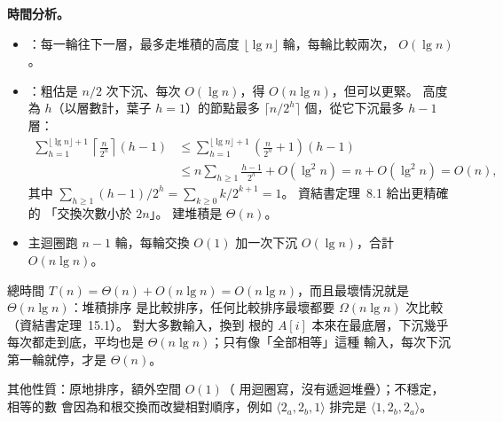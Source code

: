\begin{pastsoln}
\textbf{時間分析。}
\begin{itemize}
\item {}：每一輪往下一層，最多走堆積的高度 $\lfloor \lg n \rfloor$ 輪，每輪比較兩次，
$O(\lg n)$。
\item {}：粗估是 $n/2$ 次下沉、每次 $O(\lg n)$，得 $O(n \lg n)$，但可以更緊。
高度為 $h$（以層數計，葉子 $h = 1$）的節點最多 $\lceil n / 2^h \rceil$ 個，從它下沉最多 $h - 1$ 層：
\begin{align*}
\sum_{h=1}^{\lfloor \lg n \rfloor + 1} \left\lceil \frac{n}{2^h} \right\rceil (h - 1)
&\le \sum_{h=1}^{\lfloor \lg n \rfloor + 1} \left(\frac{n}{2^h} + 1\right)(h - 1) \\
&\le n \sum_{h \ge 1} \frac{h - 1}{2^h} + O(\lg^2 n)
= n + O(\lg^2 n) = O(n),
\end{align*}
其中 $\sum_{h \ge 1} (h-1)/2^h = \sum_{k \ge 0} k / 2^{k+1} = 1$。 資結書定理~8.1 給出更精確的
「交換次數小於 $2n$」。 建堆積是 $\Theta(n)$。
\item 主迴圈跑 $n - 1$ 輪，每輪交換 $O(1)$ 加一次下沉 $O(\lg n)$，合計 $O(n \lg n)$。
\end{itemize}
總時間 $T(n) = \Theta(n) + O(n \lg n) = O(n \lg n)$，而且最壞情況就是 $\Theta(n \lg n)$：堆積排序
是比較排序，任何比較排序最壞都要 $\Omega(n \lg n)$ 次比較（資結書定理~15.1）。 對大多數輸入，換到
根的 $A[i]$ 本來在最底層，下沉幾乎每次都走到底，平均也是 $\Theta(n \lg n)$；只有像「全部相等」這種
輸入，每次下沉第一輪就停，才是 $\Theta(n)$。

其他性質：原地排序，額外空間 $O(1)$（ 用迴圈寫，沒有遞迴堆疊）；不穩定，相等的數
會因為和根交換而改變相對順序，例如 $\langle 2_a, 2_b, 1\rangle$ 排完是 $\langle 1, 2_b, 2_a\rangle$。
\end{pastsoln}
